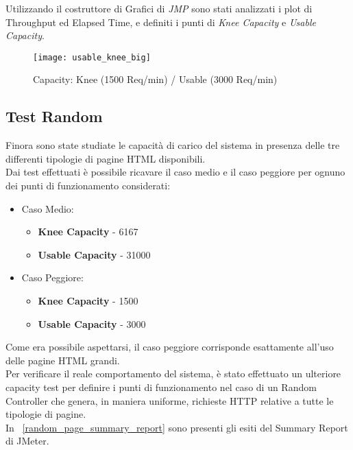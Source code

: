 Utilizzando il costruttore di Grafici di \textit{JMP} sono stati analizzati i plot
di Throughput ed Elapsed Time, e definiti i punti di \textit{Knee Capacity} e
\textit{Usable Capacity}.\\

\clearpage

\begin{figure}[!htbp]
  \centering
  \texttt{[image: usable\_knee\_big]}
  \caption{Capacity: Knee (1500 Req/min) / Usable (3000 Req/min)}
\end{figure}

\subsection{Test Random}
Finora sono state studiate le capacità di carico del sistema in presenza delle
tre differenti tipologie di pagine HTML disponibili.\\
Dai test effettuati è possibile ricavare il caso medio e il caso peggiore per
ognuno dei punti di funzionamento considerati:
\begin{itemize}
  \item Caso Medio:
  \begin{itemize}
    \item \textbf{Knee Capacity} - 6167
    \item \textbf{Usable Capacity} - 31000
  \end{itemize}
  \item Caso Peggiore:
  \begin{itemize}
    \item \textbf{Knee Capacity} - 1500
    \item \textbf{Usable Capacity} - 3000
  \end{itemize}
\end{itemize}

Come era possibile aspettarsi, il caso peggiore corrisponde esattamente all'uso
delle pagine HTML grandi.\\

Per verificare il reale comportamento del sistema, è stato effettuato un ulteriore
capacity test per definire i punti di funzionamento nel caso di un Random Controller
che genera, in maniera uniforme, richieste HTTP relative a tutte le tipologie di
pagine.\\

In \figurename~\ref{random_page_summary_report} sono presenti gli esiti del
Summary Report di JMeter.\\

